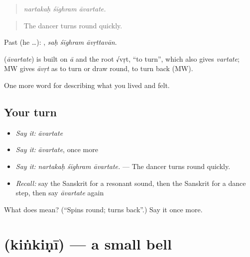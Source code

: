 \begin{quote}
  
\end{quote}

\begin{quote}
\emph{nartakaḥ śīghram āvartate.}
\end{quote}

\begin{quote}
The dancer turns round quickly.
\end{quote}

Past (he …):   , \emph{saḥ śīghram āvṛttavān}.

\begin{cousinweb}
\textbf{} (\emph{āvartate}) is built on \emph{ā} and the root √vṛt, \textquotedblleft{}to turn\textquotedblright{}, which also gives \emph{vartate}; MW gives \emph{āvṛt} as to turn or draw round, to turn back (MW).
\end{cousinweb}

\begin{grammarlens}[title={What you've built}]
One more word for describing what you lived and felt.
\end{grammarlens}

\subsection*{Your turn}
\begin{itemize}
\raggedright
  \item \emph{Say it:} \emph{āvartate}
  \item \emph{Say it:} \emph{āvartate}, once more
  \item \emph{Say it:} \emph{nartakaḥ śīghram āvartate.} — The dancer turns round quickly.
  \item \emph{Recall:} say the Sanskrit for a resonant sound, then the Sanskrit for a dance step, then say \emph{āvartate} again
\end{itemize}

\begin{tcolorbox}[breakable,colback=teal!4,colframe=teal!35!black,title={Before you move on}]
What does  mean? (\textquotedblleft{}Spins round; turns back\textquotedblright{}.) Say it once more.
\end{tcolorbox}
\section[\texorpdfstring{\sk{किंकिणी} (kiṅkiṇī)}{किंकिणी (kiṅkiṇī)}]{ (kiṅkiṇī) — a small bell}


